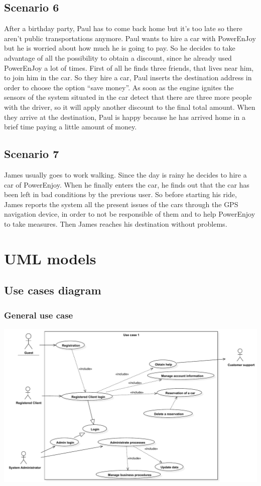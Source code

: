 \subsection{Scenario 6}
After a birthday party, Paul has to come back home but it’s too late so there aren’t public transportations anymore.
Paul wants to hire a car with PowerEnJoy but he is worried about how much he is going to pay.
So he decides to take advantage of all the possibility to obtain a discount, since he already used PowerEnJoy a lot of times.
First of all he finds three friends, that lives near him, to join him in the car.
So they hire a car, Paul inserts the destination address in order to choose the option “save money”.
As soon as the engine ignites the sensors of the system situated in the car detect that there are three more people with the driver, so it will apply another discount to the final total amount.
When they arrive at the destination, Paul is happy because he has arrived home in a brief time paying a little amount of money.

\subsection{Scenario 7}
James usually goes to work walking.
Since the day is rainy he decides to hire a car of PowerEnjoy.
When he finally enters the car, he finds out that the car has been left in bad conditions by the previous user.
So before starting his ride, James reports the system all the present issues of the cars through the GPS navigation device, in order to not be responsible of them and to help PowerEnjoy to take measures.
Then James reaches his destination without problems.

\clearpage
\section{UML models}

\subsection{Use cases diagram}
\subsubsection{General use case}
\includegraphics[width=\textwidth, keepaspectratio]{../images/diagram/use_cases/general.pdf}

